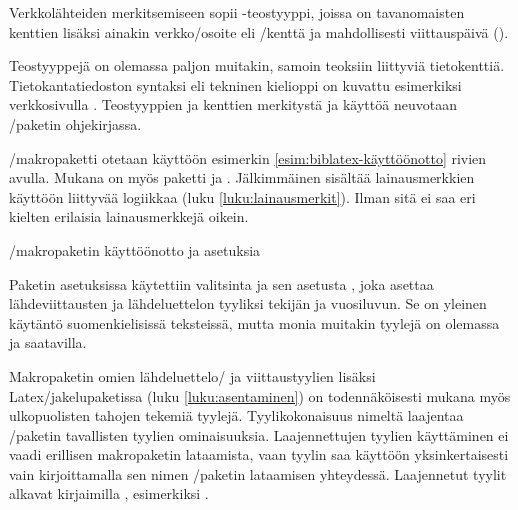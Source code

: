Verkkolähteiden%
 merkitsemiseen sopii -teostyyppi,
joissa on ta\-van\-omais\-ten kenttien lisäksi ainakin verkko\-/osoite
eli \-/kenttä ja mahdollisesti viittauspäivä
().

Teostyyppejä on olemassa paljon muitakin, samoin teoksiin liittyviä
tietokenttiä. Tietokantatiedoston syntaksi eli tekninen kieli\-oppi on
kuvattu esimerkiksi verkkosivulla
. Teostyyppien ja kenttien
merkitystä ja käyttöä neuvotaan \-/paketin
ohjekirjassa.

\-/makropaketti otetaan käyttöön esimerkin
\ref{esim:biblatex-käyttöönotto} rivien avulla. Mukana on myös paketti
 ja . Jälkimmäinen sisältää
lainausmerkkien käyttöön liittyvää logiikkaa (luku
\ref{luku:lainausmerkit}). Ilman sitä  ei saa eri
kielten erilaisia lainausmerkkejä oikein.

\begin{esimerkki}
\begin{koodilohko}
  \usepackage{polyglossia}

  \usepackage{csquotes}

  \usepackage[style=authoryear, maxbibnames=99, dashed=true]{biblatex}
\end{koodilohko}
\caption{\-/makropaketin käyttöönotto ja asetuksia}
\label{esim:biblatex-käyttöönotto}
\end{esimerkki}

Paketin asetuksissa käytettiin valitsinta  ja sen asetusta
, joka asettaa lähdeviittausten ja lähdeluettelon
tyyliksi tekijän ja vuosiluvun. Se on yleinen käytäntö suomenkielisissä
teksteissä, mutta monia muitakin tyylejä on olemassa ja saatavilla.

Makropaketin omien lähdeluettelo\-/{} ja viittaustyylien lisäksi
Latex\-/jakelupaketissa (luku \ref{luku:asentaminen}) on todennäköisesti
mukana myös ulkopuolisten tahojen tekemiä tyylejä. Tyylikokonaisuus
nimeltä  laajentaa
\-/paketin tavallisten tyylien ominaisuuksia.
Laajennettujen tyylien käyttäminen ei vaadi erillisen makropaketin
lataamista, vaan tyylin saa käyttöön yksinkertaisesti vain
kirjoittamalla sen nimen \-/paketin lataamisen
yhteydessä. Laajennetut tyylit alkavat kirjaimilla ,
esimerkiksi .

